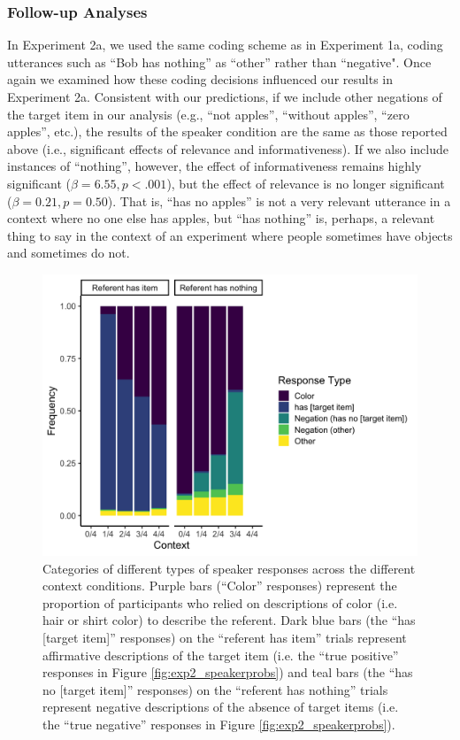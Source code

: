 \documentclass[man, floatsintext, noapacite]{apa6}
\begin{document}
\subsubsection{Follow-up Analyses}

In Experiment 2a, we used the same coding scheme as in Experiment 1a, coding utterances such as “Bob has nothing” as “other” rather than “negative". Once again we examined how these coding decisions influenced our results in Experiment 2a. Consistent with our predictions, if we include other negations of the target item in our analysis (e.g., “not apples”, “without apples”, “zero apples”, etc.), the results of the speaker condition are the same as those reported above (i.e., significant effects of relevance and informativeness). If we also include instances of “nothing”, however, the effect of informativeness remains highly significant ($\beta = 6.55, p < .001$), but the effect of relevance is no longer significant ($\beta = 0.21, p = 0.50$). That is, “has no apples” is not a very relevant utterance in a context where no one else has apples, but “has nothing” is, perhaps, a relevant thing to say in the context of an experiment where people sometimes have objects and sometimes do not.

\begin{figure}[t]
\begin{center} 
\includegraphics[width=6in]{figures/experiment2/speaker_responses_v1.png}
\caption{\label{fig:exp2_props} Categories of different types of speaker responses across the different context conditions. Purple bars (``Color'' responses) represent the proportion of participants who relied on descriptions of color (i.e. hair or shirt color) to describe the referent. Dark blue bars (the ``has [target item]'' responses) on the ``referent has item'' trials represent affirmative descriptions of the target item (i.e. the ``true positive'' responses in Figure \ref{fig:exp2_speakerprobs}) and teal bars (the ``has no [target item]'' responses) on the ``referent has nothing'' trials represent negative descriptions of the absence of target items (i.e. the ``true negative'' responses in Figure \ref{fig:exp2_speakerprobs}). }
\end{center} 
\end{figure}
\end{document}
